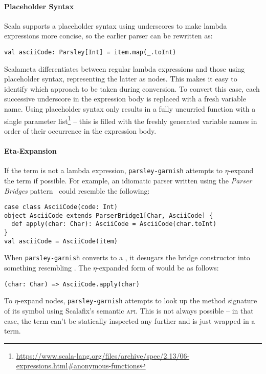 \documentclass[../../main.tex]{subfiles}
\begin{document}
\paragraph{Placeholder Syntax}
Scala supports a placeholder syntax using underscores to make lambda expressions more concise, so the earlier parser can be rewritten as:
\begin{verbatim}
val asciiCode: Parsley[Int] = item.map(_.toInt)
\end{verbatim}

Scalameta differentiates between regular lambda expressions and those using placeholder syntax, representing the latter as  nodes.
This makes it easy to identify which approach to be taken during conversion.
To convert this case, each successive underscore in the expression body is replaced with a fresh variable name.
Using placeholder syntax only results in a fully uncurried function with a single parameter list\footnote{\url{https://www.scala-lang.org/files/archive/spec/2.13/06-expressions.html#anonymous-functions}} -- this is filled with the freshly generated variable names in order of their occurrence in the expression body.

\paragraph{Eta-Expansion}
If the term is not a lambda expression, \texttt{parsley-garnish} attempts to $\eta$-expand the term if possible.
For example, an idiomatic parser written using the \emph{Parser Bridges} pattern~\cite{willis_design_2022} could resemble the following:
\begin{verbatim}
case class AsciiCode(code: Int)
object AsciiCode extends ParserBridge1[Char, AsciiCode] {
  def apply(char: Char): AsciiCode = AsciiCode(char.toInt)
}
val asciiCode = AsciiCode(item)
\end{verbatim}
%
When \texttt{parsley-garnish} converts  to a , it desugars the bridge constructor into something resembling .
The $\eta$-expanded form of  would be as follows:
\begin{verbatim}
(char: Char) => AsciiCode.apply(char)
\end{verbatim}
%
To $\eta$-expand  nodes, \texttt{parsley-garnish} attempts to look up the method signature of its symbol using Scalafix's semantic \textsc{api}.
This is not always possible -- in that case, the term can't be statically inspected any further and is just wrapped in a  term.
\end{document}
